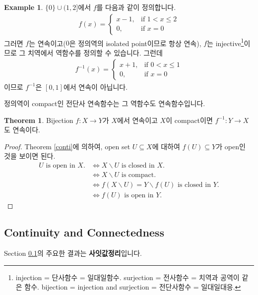 \documentclass[12pt]{article}
\theoremstyle{definition}
\newtheorem{thm}{Theorem}[section]
\newtheorem*{ex}{Example}
\begin{document}
\begin{ex}
	\(\{0\} \cup (1, 2]\)에서 \(f\)를 다음과 같이 정의합니다.
	\begin{gather*}
		f(x) = 
		\begin{cases}
			x - 1, & \text{if } 1 < x \le 2\\
			0, & \text{if } x = 0
		\end{cases}
	\end{gather*}
	그러면 \(f\)는 연속이고(\(0\)은 정의역의 isolated point이므로 항상 연속), \(f\)는 injective\footnote{injection = 단사함수 = 일대일함수. surjection = 전사함수 = 치역과 공역이 같은 함수. bijection = injection and surjection = 전단사함수 = 일대일대응.}이므로 그 치역에서 역함수를 정의할 수 있습니다. 그런데
	\begin{gather*}
		f^{-1}(x) = 
		\begin{cases}
			x + 1, & \text{if } 0 < x \le 1\\
			0, & \text{if } x = 0
		\end{cases}
	\end{gather*}
	이므로 \(f^{-1}\)은 \([0, 1]\)에서 연속이 아닙니다.
\end{ex}


정의역이 compact인 전단사 연속함수는 그 역함수도 연속함수입니다.

\begin{thm}
	Bijection \(f: X \rightarrow Y\)가 \(X\)에서 연속이고 \(X\)이 compact이면 \(f^{-1}: Y \rightarrow X\)도 연속이다.
\end{thm}
\begin{proof}
	Theorem \ref{conti}에 의하여, open set \(U \subseteq X\)에 대하여 \(f(U) \subseteq Y\)가 open인 것을 보이면 된다.\\
	\begin{align*}
		U \text{ is open in } X. &\iff X \backslash U \text{ is closed in } X.\\
		&\iff X \backslash U \text{ is compact.}\\
		&\iff f(X \backslash U)=Y \backslash f(U) \text{ is closed in } Y.\\
		&\iff f(U) \text{ is open in } Y.			
	\end{align*}
\end{proof}

\subsection{Continuity and Connectedness} \label{sec cont conn}

Section \ref{sec cont conn}의 주요한 결과는 \textbf{사잇값정리}입니다.
\end{document}
